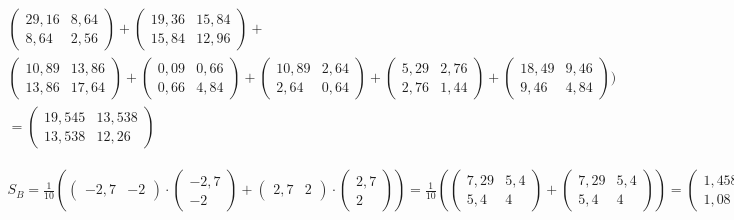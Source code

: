 \documentclass[a4paper,parskip=full-]{article}
\begin{document}
\begin{multline}
\begin{pmatrix} 29,16 & 8,64 \\ 8,64 & 2,56 \end{pmatrix} +
\begin{pmatrix} 19,36 & 15,84 \\ 15,84 & 12,96 \end{pmatrix} + \\
\begin{pmatrix} 10,89 & 13,86 \\ 13,86 & 17,64 \end{pmatrix} +
\begin{pmatrix} 0,09 & 0,66 \\ 0,66 & 4,84 \end{pmatrix} +
\begin{pmatrix} 10,89 & 2,64 \\ 2,64 & 0,64 \end{pmatrix} +
\begin{pmatrix} 5,29 & 2,76 \\ 2,76 & 1,44 \end{pmatrix} +
\begin{pmatrix} 18,49 & 9,46 \\ 9,46 & 4,84 \end{pmatrix} \Biggr) \\
= \begin{pmatrix} 19,545 & 13,538 \\ 13,538 & 12,26 \end{pmatrix}
\end{multline}

\begin{multline}
S_B = \frac{1}{10}\left(  
\begin{pmatrix} -2,7 &  -2 \end{pmatrix} \cdot
\begin{pmatrix} -2,7 \\ -2 \end{pmatrix} +
\begin{pmatrix} 2,7 &  2 \end{pmatrix} \cdot
\begin{pmatrix} 2,7 \\ 2 \end{pmatrix}
\right)
= \frac{1}{10}\left( 
\begin{pmatrix} 7,29 & 5,4 \\ 5,4 & 4 \end{pmatrix} +
\begin{pmatrix} 7,29 & 5,4 \\ 5,4 & 4 \end{pmatrix}
\right)
= \begin{pmatrix} 1,458 & 1,08 \\ 1,08 & 0,8 \end{pmatrix}
\end{multline}
\end{document}
